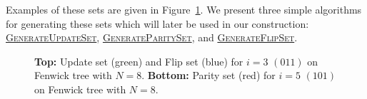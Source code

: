 \documentclass[pdftex,pra,aps,twocolumn,twoside]{revtex4-1}
\theoremstyle{plain}
\theoremstyle{note}
\newcommand\+{{\footnotesize \raisebox{0.3ex}{+}}}
\begin{document}
Examples of these sets are given in Figure~\ref{fenwick_trees}. We present three simple algorithms for generating these sets which will later be used in our construction: \hyperref[GenerateUpdateSet]{\textsc{GenerateUpdateSet}}, \hyperref[GenerateParitySet]{\textsc{GenerateParitySet}}, and \hyperref[GenerateFlipSet]{\textsc{GenerateFlipSet}}.
\begin{figure}[htbp]
\caption{\label{fenwick_trees} \textbf{Top:}  Update set (green) and Flip set (blue) for $i=3$ $(011)$ on Fenwick tree with $N=8$. \textbf{Bottom:} Parity set (red) for $i=5$ $(101)$ on Fenwick tree with $N=8$.}
\end{figure} \noindent
\end{document}
